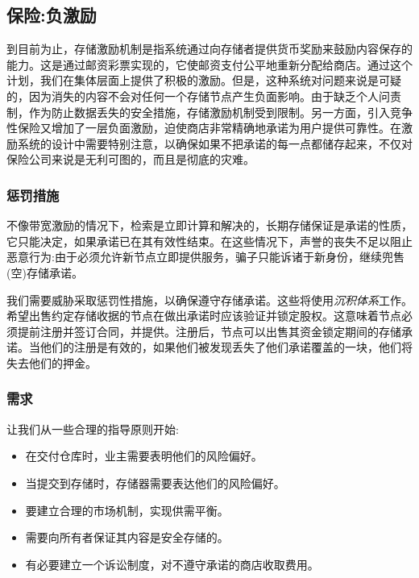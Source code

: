 \subsection{保险:负激励\statusorange}\label{sec:chunk-insurance}


到目前为止，存储激励机制是指系统通过向存储者提供货币奖励来鼓励内容保存的能力。这是通过邮资彩票实现的，它使邮资支付公平地重新分配给商店。通过这个计划，我们在集体层面上提供了积极的激励。但是，这种系统对问题来说是可疑的，因为消失的内容不会对任何一个存储节点产生负面影响。由于缺乏个人问责制，作为防止数据丢失的安全措施，存储激励机制受到限制。另一方面，引入竞争性保险又增加了一层负面激励，迫使商店非常精确地承诺为用户提供可靠性。在激励系统的设计中需要特别注意，以确保如果不把承诺的每一点都储存起来，不仅对保险公司来说是无利可图的，而且是彻底的灾难。 

\subsubsection{惩罚措施}

不像带宽激励的情况下，检索是立即计算和解决的，长期存储保证是承诺的性质，它只能决定，如果承诺已在其有效性结束。在这些情况下，声誉的丧失不足以阻止恶意行为:由于必须允许新节点立即提供服务，骗子只能诉诸于新身份，继续兜售(空)存储承诺。

我们需要威胁采取惩罚性措施，以确保遵守存储承诺。这些将使用\emph{沉积体系}工作。希望出售约定存储收据的节点在做出承诺时应该验证并锁定股权。这意味着节点必须提前注册并签订合同，并提供。注册后，节点可以出售其资金锁定期间的存储承诺。当他们的注册是有效的，如果他们被发现丢失了他们承诺覆盖的一块，他们将失去他们的押金。

\subsubsection{需求}

让我们从一些合理的指导原则开始:

\begin{itemize}
\item 在交付仓库时，业主需要表明他们的风险偏好。
\item 当提交到存储时，存储器需要表达他们的风险偏好。
\item 要建立合理的市场机制，实现供需平衡。
\item 需要向所有者保证其内容是安全存储的。
\item 有必要建立一个诉讼制度，对不遵守承诺的商店收取费用。
\end{itemize}

